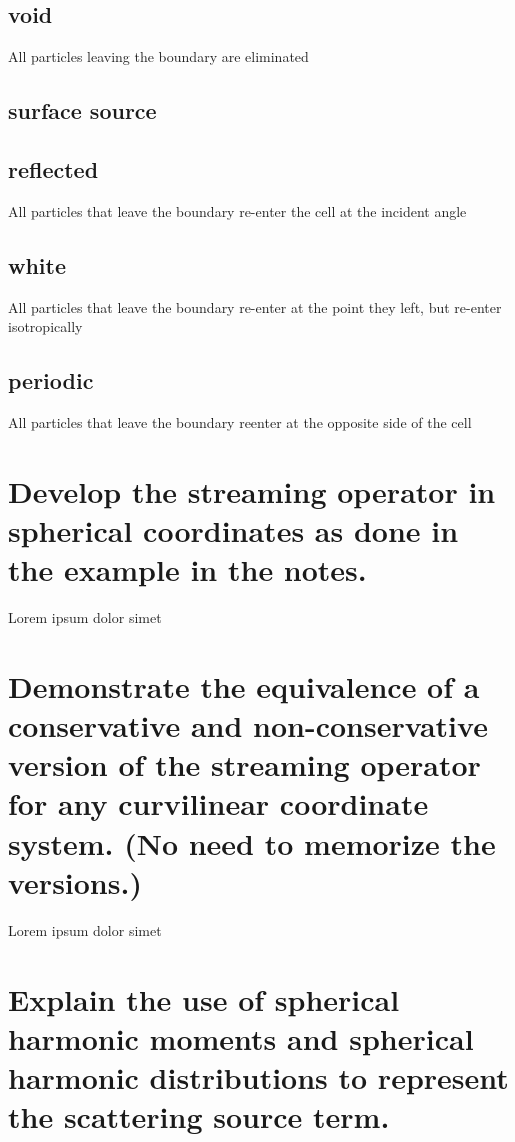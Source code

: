 \documentclass{article}
\begin{document}
\subsection{void}
All particles leaving the boundary are eliminated

\subsection{surface source}

\subsection{reflected}
All particles that leave the boundary re-enter the cell at the incident angle

\subsection{white}
All particles that leave the boundary re-enter at the point they left, but re-enter isotropically

\subsection{periodic}
All particles that leave the boundary reenter at the opposite side of the cell

\newpage
\section{Develop the streaming operator in spherical coordinates as done in the example in the notes.}

Lorem ipsum dolor simet

\newpage
\section{Demonstrate the equivalence of a conservative and non-conservative version of the streaming operator for any curvilinear coordinate system. (No need to memorize the versions.)}

Lorem ipsum dolor simet

\newpage
\section{Explain the use of spherical harmonic moments and spherical harmonic distributions to represent the scattering source term.}
\end{document}
